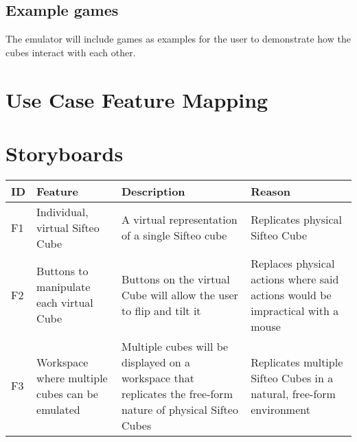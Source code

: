 \documentclass[12pt]{article}
\begin{document}
  \subsection{Example games}
    The emulator will include games as examples for the user to demonstrate how the cubes interact with each other.

\section{Use Case Feature Mapping}


\section{Storyboards}

    \begin{landscape}
    \begin{table}[h]
      \begin{tabular}{p{.5in} | p{2.25in} | p{2.75in} | p{3in}}
        \textbf{ID} &
        \textbf{Feature} &
        \textbf{Description} &
        \textbf{Reason} 
        \\ \hline

        F1 &
        Individual, virtual Sifteo Cube &
        A virtual representation of a single Sifteo cube &
        Replicates physical Sifteo Cube
        \\ \hline

        F2 &
        Buttons to manipulate each virtual Cube &
        Buttons on the virtual Cube will allow the user to flip and tilt it &
        Replaces physical actions where said actions would be impractical with a mouse
        \\ \hline

        F3 &
        Workspace where multiple cubes can be emulated &
        Multiple cubes will be displayed on a workspace that replicates the free-form nature of physical Sifteo Cubes\index{Sifteo Cubes} &
        Replicates multiple Sifteo Cubes\index{Sifteo Cubes} in a natural, free-form environment
        \\ \hline


\end{tabular}
\end{table}
\end{landscape}
\end{document}
